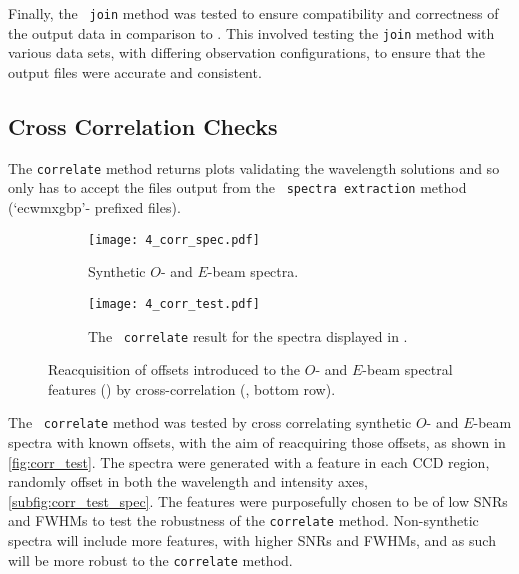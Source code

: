 Finally, the \stops\ \texttt{join} method was tested to ensure compatibility and correctness of the output data in comparison to \polsalt.
This involved testing the \texttt{join} method with various data sets, with differing observation configurations, to ensure that the output files were accurate and consistent.

\subsection[The \texttt{correlate} Method]{Cross Correlation Checks} \label{subsec:test_corr}

The \texttt{correlate} method returns plots validating the wavelength solutions and so only has to accept the files output from the \polsalt\ \texttt{spectra extraction}  method (`ecwmxgbp'- prefixed files).

\begin{figure}
    \centering
    \begin{subfigure}[b]{\textwidth}
        \centering
        \texttt{[image: 4\_corr\_spec.pdf]}
        \caption{Synthetic $O$- and $E$-beam spectra.}
        \label{subfig:corr_test_spec}
    \end{subfigure}
    \hfill
    \begin{subfigure}[b]{\textwidth}
        \centering
        \texttt{[image: 4\_corr\_test.pdf]}
        \caption{The \stops\ \texttt{correlate} result for the spectra displayed in .}
        \label{subfig:corr_test_corr}
    \end{subfigure}
    \caption{Reacquisition of offsets introduced to the $O$- and $E$-beam spectral features () by cross-correlation (, bottom row).}
    \label{fig:corr_test}
\end{figure}

The \stops\ \texttt{correlate} method was tested by cross correlating synthetic $O$- and $E$-beam spectra with known offsets, with the aim of reacquiring those offsets, as shown in \autoref{fig:corr_test}.
The spectra were generated with a feature in each \gls{CCD} region, randomly offset in both the wavelength and intensity axes, \autoref{subfig:corr_test_spec}.
The features were purposefully chosen to be of low \glspl{SNR} and \glspl{FWHM} to test the robustness of the \texttt{correlate} method.
Non-synthetic spectra will include more features, with higher \glspl{SNR} and \glspl{FWHM}, and as such will be more robust to the \texttt{correlate} method.

